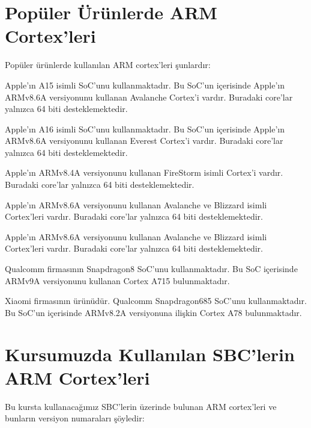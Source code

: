 \documentclass[letterpaper,10pt,turkish]{sphinxmanual}
\begin{document}
\section{Popüler Ürünlerde ARM Cortex’leri}
\label{\detokenize{introduction:populer-urunlerde-arm-cortex-leri}}
\sphinxAtStartPar
Popüler ürünlerde kullanılan ARM cortex’leri şunlardır:
\begin{description}
\sphinxAtStartPar
Apple’ın A15 isimli SoC’unu kullanmaktadır. Bu SoC’un içerisinde Apple’ın ARMv8.6\sphinxhyphen{}A
versiyonunu kullanan Avalanche Cortex’i vardır. Buradaki core’lar yalnızca 64 biti
desteklemektedir.

\sphinxAtStartPar
Apple’ın A16 isimli SoC’unu kullanmaktadır. Bu SoC’un içerisinde Apple’ın ARMv8.6\sphinxhyphen{}A
versiyonunu kullanan Everest Cortex’i vardır. Buradaki core’lar yalnızca 64 biti
desteklemektedir.

\sphinxAtStartPar
Apple’ın ARMv8.4\sphinxhyphen{}A versiyonunu kullanan FireStorm isimli Cortex’i vardır. Buradaki core’lar
yalnızca 64 biti desteklemektedir.

\sphinxAtStartPar
Apple’ın ARMv8.6\sphinxhyphen{}A versiyonunu kullanan Avalanche ve Blizzard isimli Cortex’leri vardır.
Buradaki core’lar yalnızca 64 biti desteklemektedir.

\sphinxAtStartPar
Apple’ın ARMv8.6\sphinxhyphen{}A versiyonunu kullanan Avalanche ve Blizzard isimli Cortex’leri vardır.
Buradaki core’lar yalnızca 64 biti desteklemektedir.

\sphinxAtStartPar
Qualcomm firmasının Snapdragon\sphinxhyphen{}8 SoC’unu kullanmaktadır. Bu SoC içerisinde ARMv9\sphinxhyphen{}A versiyonunu
kullanan Cortex A715 bulunmaktadır.

\sphinxAtStartPar
Xiaomi firmasının ürünüdür. Qualcomm Snapdragon\sphinxhyphen{}685 SoC’unu kullanmaktadır. Bu SoC’un
içerisinde ARMv8.2\sphinxhyphen{}A versiyonuna ilişkin Cortex A78 bulunmaktadır.

\end{description}


\section{Kursumuzda Kullanılan SBC’lerin ARM Cortex’leri}
\label{\detokenize{introduction:kursumuzda-kullanilan-sbc-lerin-arm-cortex-leri}}
\sphinxAtStartPar
Bu kursta kullanacağımız SBC’lerin üzerinde bulunan ARM cortex’leri ve bunların versiyon
numaraları şöyledir:
\end{document}
